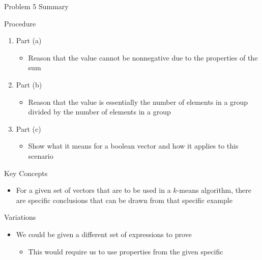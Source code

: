 \begin{summary}{Problem 5 Summary}
    \begin{statement}{Procedure}
        \begin{enumerate}[label = (\alph*)]
            \item Part (a)
            \begin{itemize}
                \item Reason that the value cannot be nonnegative due to the properties of the sum
            \end{itemize}
            \item Part (b)
            \begin{itemize}
                \item Reason that the value is essentially the number of elements in a group divided by the number of elements in a group
            \end{itemize}
            \item Part (c)
            \begin{itemize}
                \item Show what it means for a boolean vector and how it applies to this scenario
            \end{itemize}
        \end{enumerate}
    \end{statement}
    \begin{statement}{Key Concepts}
        \begin{itemize}
            \item For a given set of vectors that are to be used in a $k$-means algorithm, there are specific conclusions that can be drawn from that specific example
        \end{itemize}
    \end{statement}
    \begin{statement}{Variations}
        \begin{itemize}
            \item We could be given a different set of expressions to prove
            \begin{itemize}
                \item This would require us to use properties from the given specific
            \end{itemize}
        \end{itemize}
    \end{statement}
\end{summary}